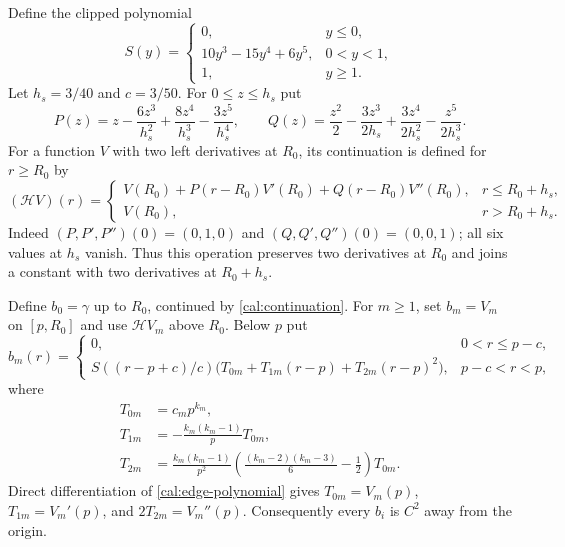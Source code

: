 Define the clipped polynomial
\[
 S(y)=\begin{cases}
 0,&y\le0,\\
 10y^3-15y^4+6y^5,&0<y<1,\\
 1,&y\ge1.
 \end{cases}
\]
Let $h_s=3/40$ and $c=3/50$.  For $0\le z\le h_s$ put
\[
 P(z)=z-\frac{6z^3}{h_s^2}+\frac{8z^4}{h_s^3}-\frac{3z^5}{h_s^4},\qquad
 Q(z)=\frac{z^2}{2}-\frac{3z^3}{2h_s}
                       +\frac{3z^4}{2h_s^2}-\frac{z^5}{2h_s^3}.
\]
For a function $V$ with two left derivatives at $R_0$, its continuation
is defined for $r\ge R_0$ by
\begin{equation}\label{cal:continuation}
 (\mathcal HV)(r)=
 \begin{cases}
 V(R_0)+P(r-R_0)V'(R_0)+Q(r-R_0)V''(R_0),&r\le R_0+h_s,\\
 V(R_0),&r>R_0+h_s.
 \end{cases}
\end{equation}
Indeed $(P,P',P'')(0)=(0,1,0)$ and
$(Q,Q',Q'')(0)=(0,0,1)$; all six values at $h_s$ vanish.
Thus this operation preserves two derivatives at $R_0$ and joins a
constant with two derivatives at $R_0+h_s$.

Define $b_0=\gamma$ up to $R_0$, continued by
\eqref{cal:continuation}.  For $m\ge1$, set $b_m=V_m$ on $[p,R_0]$
and use $\mathcal HV_m$ above $R_0$.
Below $p$ put
\begin{equation}\label{cal:inner-continuation}
 b_m(r)=\begin{cases}
 0,&0<r\le p-c,\\
 S((r-p+c)/c)\bigl(T_{0m}+T_{1m}(r-p)+T_{2m}(r-p)^2\bigr),&p-c<r<p,
 \end{cases}
\end{equation}
where
\[
 \begin{split}
 T_{0m}&=c_mp^{k_m},\\
 T_{1m}&=-\frac{k_m(k_m-1)}pT_{0m},\\
 T_{2m}&=\frac{k_m(k_m-1)}{p^2}
             \left(\frac{(k_m-2)(k_m-3)}6-\frac12\right)T_{0m}.
 \end{split}
\]
Direct differentiation of \eqref{cal:edge-polynomial} gives
$T_{0m}=V_m(p)$, $T_{1m}=V_m'(p)$, and $2T_{2m}=V_m''(p)$.
Consequently every $b_i$ is $C^2$ away from the origin.


